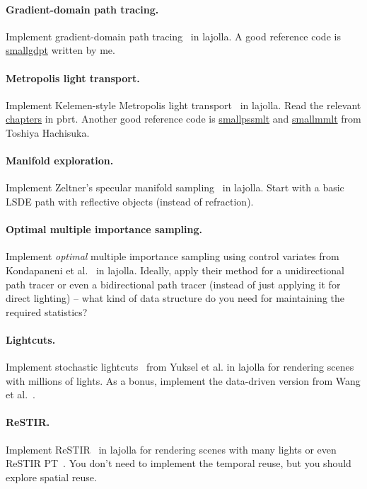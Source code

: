 \paragraph{Gradient-domain path tracing.} 
Implement gradient-domain path tracing~\cite{Kettunen:2015:GPT} in lajolla.
A good reference code is \href{https://gist.github.com/BachiLi/4f5c6e5a4fef5773dab1}{smallgdpt} written by me.

\paragraph{Metropolis light transport.} Implement Kelemen-style Metropolis light transport~\cite{Kelemen:2002:SRM} in lajolla. Read the relevant \href{https://www.pbr-book.org/3ed-2018/Light_Transport_III_Bidirectional_Methods/Metropolis_Light_Transport}{chapters} in pbrt. Another good reference code is \href{https://cs.uwaterloo.ca/~thachisu/smallpssmlt.cpp}{smallpssmlt} and \href{https://cs.uwaterloo.ca/~thachisu/smallmmlt.cpp}{smallmmlt} from Toshiya Hachisuka.

\paragraph{Manifold exploration.} Implement Zeltner's specular manifold sampling~\cite{Zeltner:2020:SMS} in lajolla. Start with a basic LSDE path with reflective objects (instead of refraction).

\paragraph{Optimal multiple importance sampling.}
Implement \emph{optimal} multiple importance sampling using control variates from Kondapaneni et al.~\cite{Kondapaneni:2019:OMI} in lajolla.
Ideally, apply their method for a unidirectional path tracer or even a bidirectional path tracer (instead of just applying it for direct lighting) -- what kind of data structure do you need for maintaining the required statistics?

\paragraph{Lightcuts.}
Implement stochastic lightcuts~\cite{Yuksel:2019:SL} from Yuksel et al. in lajolla for rendering scenes with millions of lights.
As a bonus, implement the data-driven version from Wang et al.~\cite{Wang:2021:LCR}.

\paragraph{ReSTIR.}
Implement ReSTIR~\cite{Bitterli:2020:SRR} in lajolla for rendering scenes with many lights or even ReSTIR PT~\cite{Lin:2022:GRI}.
You don't need to implement the temporal reuse, but you should explore spatial reuse.

